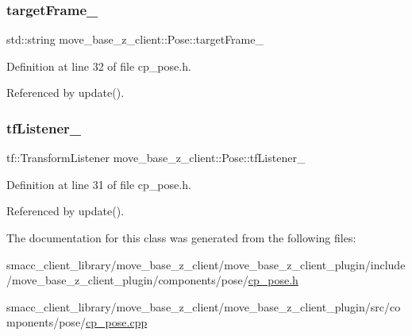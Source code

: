 \subsubsection{\texorpdfstring{target\+Frame\+\_\+}{targetFrame\_}}
{\footnotesize\ttfamily std\+::string move\+\_\+base\+\_\+z\+\_\+client\+::\+Pose\+::target\+Frame\+\_\+\hspace{0.3cm}{\ttfamily [private]}}



Definition at line 32 of file cp\+\_\+pose.\+h.



Referenced by update().

\mbox{\label{classmove__base__z__client_1_1Pose_ac932048a4bb8e389642c290b2c8dcefc}} 
\subsubsection{\texorpdfstring{tf\+Listener\+\_\+}{tfListener\_}}
{\footnotesize\ttfamily tf\+::\+Transform\+Listener move\+\_\+base\+\_\+z\+\_\+client\+::\+Pose\+::tf\+Listener\+\_\+\hspace{0.3cm}{\ttfamily [private]}}



Definition at line 31 of file cp\+\_\+pose.\+h.



Referenced by update().



The documentation for this class was generated from the following files\+:\begin{DoxyCompactItemize}
\item 
smacc\+\_\+client\+\_\+library/move\+\_\+base\+\_\+z\+\_\+client/move\+\_\+base\+\_\+z\+\_\+client\+\_\+plugin/include/move\+\_\+base\+\_\+z\+\_\+client\+\_\+plugin/components/pose/\hyperlink{cp__pose_8h}{cp\+\_\+pose.\+h}\item 
smacc\+\_\+client\+\_\+library/move\+\_\+base\+\_\+z\+\_\+client/move\+\_\+base\+\_\+z\+\_\+client\+\_\+plugin/src/components/pose/\hyperlink{cp__pose_8cpp}{cp\+\_\+pose.\+cpp}\end{DoxyCompactItemize}
